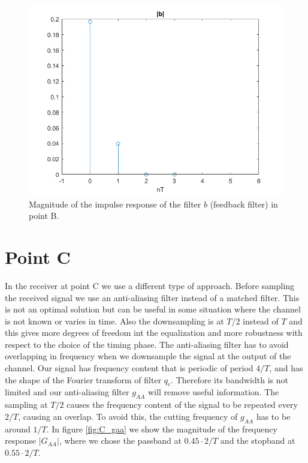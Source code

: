 \documentclass[a4paper,11.5pt]{article}
\begin{document}
\begin{figure}[ht]
	\begin{center}   
		\includegraphics[width=\textwidth]{figs/B_b.png} 
		\caption{Magnitude of the impulse response of the filter $b$ (feedback filter) in point B.}
		\label{fig:B_b}
	\end{center}
\end{figure}

\section*{Point C}

In the receiver at point C we use a different type of approach. Before sampling the received signal we use an anti-aliasing filter instead of a matched filter. This is not an optimal solution but can be useful in some situation where the channel is not known or varies in time. Also the downsampling is at $T/2$ instead of $T$ and this gives more degrees of freedom int the equalization and more robustness with respect to the choice of the timing phase. The anti-aliasing filter has to avoid overlapping in frequency when we downsample the signal at the output of the channel. Our signal has frequency content that is periodic of period $4/T$, and has the shape of the Fourier transform of filter $q_c$. Therefore its bandwidth is not limited and our anti-aliasing filter $g_{AA}$ will remove useful information. The sampling at $T/2$ causes the frequency content of the signal to be repeated every $2/T$, causing an overlap. To avoid this, the cutting frequency of $g_{AA}$ has to be around $1/T$. In figure \ref{fig:C_gaa} we show the magnitude of the frequency response $|G_{AA}|$, where we chose the passband at $0.45 \cdot 2/T$ and the stopband at $0.55\cdot 2/T$.
\end{document}
